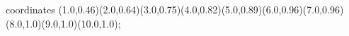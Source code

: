 					coordinates { (1.0,0.46)(2.0,0.64)(3.0,0.75)(4.0,0.82)(5.0,0.89)(6.0,0.96)(7.0,0.96)(8.0,1.0)(9.0,1.0)(10.0,1.0)};